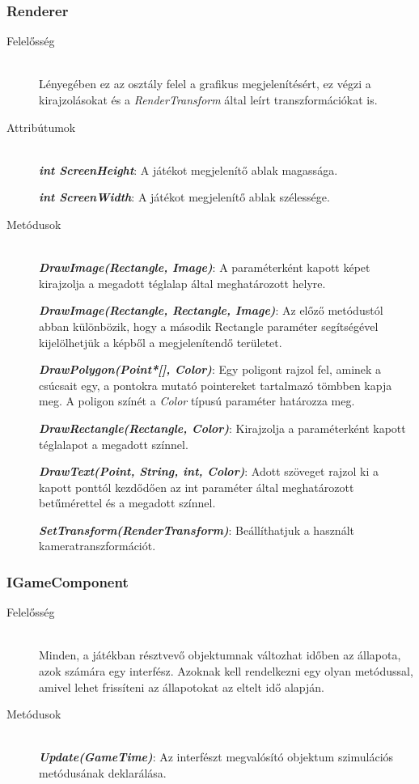 \subsubsection{Renderer}
	\begin{description}
		\item[Felelősség] \hfill \\
		Lényegében ez az osztály felel a grafikus megjelenítésért, ez végzi a kirajzolásokat és a {\itshape RenderTransform} által leírt transzformációkat is.
		
		\item[Attribútumok]\hfill \\
		\textbf{\emph{int ScreenHeight}}: A játékot megjelenítő ablak magassága.
		
		\textbf{\emph{int ScreenWidth}}: A játékot megjelenítő ablak szélessége.		
				
		\item[Metódusok]\hfill \\
		\textbf{\emph{DrawImage(Rectangle, Image)}}: A paraméterként kapott képet kirajzolja a megadott téglalap által meghatározott helyre.
		
		\textbf{\emph{DrawImage(Rectangle, Rectangle, Image)}}: Az előző metódustól abban különbözik, hogy a második Rectangle paraméter segítségével kijelölhetjük a képből a megjelenítendő területet.
		
		\textbf{\emph{DrawPolygon(Point*[], Color)}}: Egy poligont rajzol fel, aminek a csúcsait egy, a pontokra mutató pointereket tartalmazó tömbben kapja meg. A poligon színét a {\itshape Color} típusú paraméter határozza meg.
		
		\textbf{\emph{DrawRectangle(Rectangle, Color)}}: Kirajzolja a paraméterként kapott téglalapot a megadott színnel.
		
		\textbf{\emph{DrawText(Point, String, int, Color)}}: Adott szöveget rajzol ki a kapott ponttól kezdődően az int paraméter által meghatározott betűmérettel és a megadott színnel.
		
		\textbf{\emph{SetTransform(RenderTransform)}}: Beállíthatjuk a használt kameratranszformációt.
						
	\end{description}
	
	

\subsubsection{IGameComponent}
	\begin{description}
		\item[Felelősség] \hfill \\
		Minden, a játékban résztvevő objektumnak változhat időben az állapota, azok számára egy interfész. Azoknak kell rendelkezni egy olyan metódussal, amivel lehet frissíteni az állapotokat az eltelt idő alapján.

		\item[Metódusok]\hfill \\
		\textbf{\emph{Update(GameTime)}}: Az interfészt megvalósító objektum szimulációs metódusának deklarálása.
	\end{description}
	
